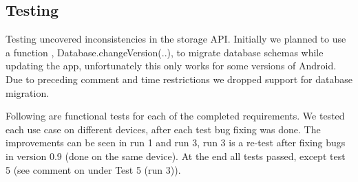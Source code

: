 \subsection{Testing}

Testing uncovered inconsistencies in the storage API. Initially we planned to
use a function , Database.changeVersion(..), to migrate database schemas while
updating the app, unfortunately this only works for some versions of Android.
Due to preceding comment and time restrictions we dropped support for database
migration.

Following are functional tests for each of the completed requirements. We tested
each use case on different devices, after each test bug fixing was done. The
improvements can be seen in run 1 and run 3, run 3 is a re-test after fixing
bugs in version 0.9 (done on the same device). At the end all tests passed,
except test 5 (see comment on under Test 5 (run 3)).



